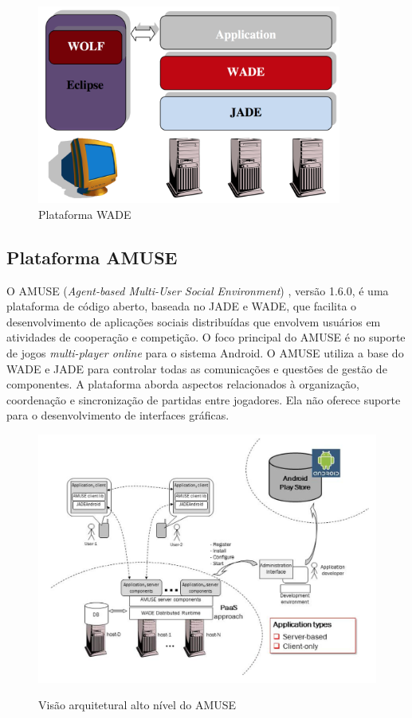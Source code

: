 \begin{figure}[h]
  \centering
  \includegraphics[width=10cm]{figuras/wade}
  \caption{Plataforma WADE \cite{wadeUserGuide}}
  \label{figura:wade}
\end{figure}

    \subsection{Plataforma AMUSE}
    \label{sec:amusePlatform}    

O AMUSE (\textit{Agent-based Multi-User Social Environment}) \cite{amuse},
versão 1.6.0, é uma plataforma de código aberto, baseada no JADE e WADE, que
facilita o desenvolvimento de aplicações sociais distribuídas que envolvem
usuários em atividades de cooperação e competição. O foco principal do AMUSE é
no suporte de jogos \textit{multi-player online} para o sistema Android. O
AMUSE utiliza a base do WADE e JADE para controlar todas as comunicações e
questões de gestão de componentes. A plataforma aborda aspectos relacionados à
organização, coordenação e sincronização de partidas entre jogadores. Ela não
oferece suporte para o desenvolvimento de interfaces gráficas.

\begin{figure}[h]
  \centering
  \includegraphics[width=13cm]{figuras/amuse_architecture}
  \caption{Visão arquitetural alto nível do AMUSE}
  \cite{bergenti2015}
  \label{figura:amuse_architecture}
\end{figure}

